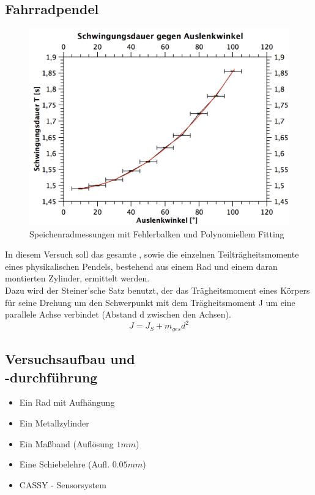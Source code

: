 \documentclass[12pt,a4paper]{article}
\begin{document}
\begin{multicols}{2}


\section{Fahrradpendel}
\begin{figure}[H]
	\centering
  	\includegraphics[scale=0.45]{./figure/speichenrad_fit_error.png}
	\caption{Speichenradmessungen mit Fehlerbalken und Polynomiellem Fitting}
	\label{fig:rad_fit}
\end{figure}
\noindent
In diesem Versuch soll das gesamte , sowie die einzelnen Teilträgheitsmomente eines physikalischen Pendels, bestehend aus einem Rad und einem daran montierten Zylinder, ermittelt werden.\\
Dazu wird der Steiner'sche Satz benutzt, der das Trägheitsmoment eines Körpers für seine Drehung um den Schwerpunkt mit dem Trägheitsmoment J um eine parallele Achse verbindet (Abstand d zwischen den Achsen).\\
$$ J = J_{S} + m_{ges}d^2 $$

\subsection{Versuchsaufbau und \\-durchführung}

\begin{itemize}
	\item Ein Rad mit Aufhängung
	\item Ein Metallzylinder
	\item Ein Maßband (Auflösung $1 mm$)
	\item Eine Schiebelehre (Aufl. $0.05mm$)
	\item CASSY - Sensorsystem
\end{itemize}


\end{multicols}
\end{document}
